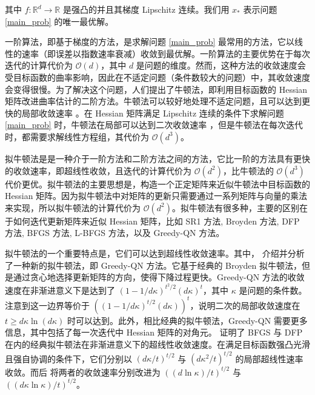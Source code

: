 \documentclass[a4paper,twoside,AutoFakeBold]{article}
\theoremstyle{definition}
\begin{document}
其中 $f:\mathbb{R}^d\to \mathbb{R}$ 是强凸的并且其梯度 Lipschitz 连续。我们用 $x_*$ 表示问题 \eqref{main_prob} 的唯一最优解。

一阶算法，即基于梯度的方法，是求解问题 \eqref{main_prob} 最常用的方法，它以线性的速率（即误差以指数速率衰减）收敛到最优解。一阶算法的主要优势在于每次迭代的计算代价为 $\mathcal{O}(d)$，其中 $d$ 是问题的维度。然而，这种方法的收敛速度会受目标函数的曲率影响，因此在不适定问题（条件数较大的问题）中，其收敛速度会变得很慢。为了解决这个问题，人们提出了牛顿法，即利用目标函数的 Hessian 矩阵改进曲率估计的二阶方法。牛顿法可以较好地处理不适定问题，且可以达到更快的局部收敛速率 \cite{bennett1916newton}\cite{ortega1970iterative}\cite{conn2000trust}\cite{nesterov2006cubic}。在 Hessian 矩阵满足 Lipschitz 连续的条件下求解问题 \eqref{main_prob} 时，牛顿法在局部可以达到二次收敛速率 \cite[Chapter 9]{boyd2004convex}，但是牛顿法在每次迭代时，都需要求解线性方程组，其代价为 $\mathcal{O}(d^3)$。

拟牛顿法是是一种介于一阶方法和二阶方法之间的方法，它比一阶的方法具有更快的收敛速率，即超线性收敛，且迭代的计算代价为 $\mathcal{O}(d^2)$，比牛顿法的 $\mathcal{O}(d^3)$ 代价更优。拟牛顿法的主要思想是，构造一个正定矩阵来近似牛顿法中目标函数的 Hessian 矩阵。因为拟牛顿法中对矩阵的更新只需要通过一系列矩阵与向量的乘法来实现，所以拟牛顿法的计算代价为 $\mathcal{O}(d^2)$。拟牛顿法有很多种，主要的区别在于如何迭代更新矩阵来近似 Hessian 矩阵，比如 SR1 方法\cite{conn1991convergence}, Broyden 方法\cite{broyden1965class}\cite{broyden1973quasi}\cite{gay1979some}, DFP 方法\cite{davidon1959variable}\cite{fletcher1963rapidly}, BFGS 方法\cite{broyden1970convergence}\cite{fletcher1970new}\cite{goldfarb1970family}\cite{shanno1970conditioning}, L-BFGS 方法\cite{nocedal1980updating}\cite{DingNocedal}，以及 Greedy-QN 方法\cite{rodomanov2020greedy}。

拟牛顿法的一个重要特点是，它们可以达到超线性收敛速率。其中，\citet{rodomanov2020greedy} 介绍并分析了一种新的拟牛顿法，即 Greedy-QN 方法。它基于经典的 Broyden 拟牛顿法，但是通过贪心地选择更新矩阵的方向，使得下降过程更快。Greedy-QN 方法的收敛速度在非渐进意义下是达到了 $(1 - {1}/{d\kappa})^{t^2/2}(d\kappa)^t$，其中 $\kappa$ 是问题的条件数。注意到这一边界等价于 $((1 - {1}/{d\kappa})^{t/2}(d\kappa))^t$，说明二次的局部收敛速度在 $t\geq d\kappa \ln (d\kappa)$ 时可以达到。此外，相比经典的拟牛顿法，Greedy-QN 需要更多信息，其中包括了每一次迭代中 Hessian 矩阵的对角元。\citet{rodomanov2020rates} 证明了 BFGS 与 DFP 在内的经典拟牛顿法在非渐进意义下的超线性收敛速度。在满足目标函数强凸光滑且强自协调的条件下，它们分别以 $({d\kappa}/{t})^{t/2}$ 与 $({d\kappa^2}/{t})^{t/2}$ 的局部超线性速率收敛。而后 \citet{rodomanov2020ratesnew} 将两者的收敛速率分别改进为 $({(d\ln{\kappa})}/{t})^{{t}/{2}}$ 与 $({(d\kappa\ln{\kappa})}/{t})^{{t}/{2}}$。
\end{document}
